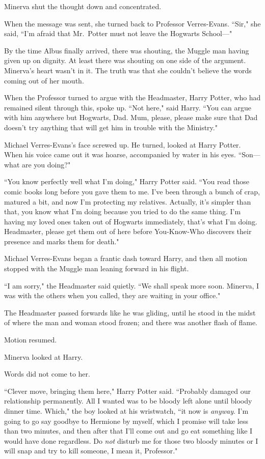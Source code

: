 Minerva shut the thought down and concentrated.

When the message was sent, she turned back to Professor Verres-Evans. ``Sir," she said, ``I'm afraid that Mr.~Potter must not leave the Hogwarts School—"

By the time Albus finally arrived, there was shouting, the Muggle man having given up on dignity. At least there was shouting on one side of the argument. Minerva's heart wasn't in it. The truth was that she couldn't believe the words coming out of her mouth.

When the Professor turned to argue with the Headmaster, Harry Potter, who had remained silent through this, spoke up. ``Not here," said Harry. ``You can argue with him anywhere but Hogwarts, Dad. Mum, please, please make sure that Dad doesn't try anything that will get him in trouble with the Ministry."

Michael Verres-Evans's face screwed up. He turned, looked at Harry Potter. When his voice came out it was hoarse, accompanied by water in his eyes. ``Son—what are you doing?"

``You know perfectly well what I'm doing," Harry Potter said. ``You read those comic books long before you gave them to me. I've been through a bunch of crap, matured a bit, and now I'm protecting my relatives. Actually, it's simpler than that, you know what I'm doing because you tried to do the same thing. I'm having my loved ones taken out of Hogwarts immediately, that's what I'm doing. Headmaster, please get them out of here before You-Know-Who discovers their presence and marks them for death."

Michael Verres-Evans began a frantic dash toward Harry, and then all motion stopped with the Muggle man leaning forward in his flight.

``I am sorry," the Headmaster said quietly. ``We shall speak more soon. Minerva, I was with the others when you called, they are waiting in your office."

The Headmaster passed forwards like he was gliding, until he stood in the midst of where the man and woman stood frozen; and there was another flash of flame.

Motion resumed.

Minerva looked at Harry.

Words did not come to her.

``Clever move, bringing them here," Harry Potter said. ``Probably damaged our relationship permanently. All I wanted was to be bloody left alone until bloody dinner time. Which," the boy looked at his wristwatch, ``it now is \emph{anyway}. I'm going to go say goodbye to Hermione by myself, which I promise will take less than two minutes, and then after that I'll come out and go eat something like I would have done regardless. Do \emph{not} disturb me for those two bloody minutes or I will snap and try to kill someone, I mean it, Professor."

